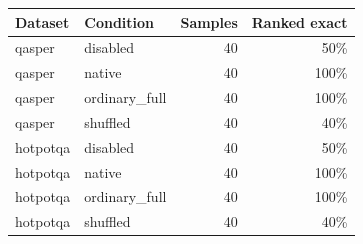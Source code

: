 \begin{tabular}{llrr}
\toprule
Dataset & Condition & Samples & Ranked exact \\
\midrule
qasper & disabled & 40 & 50\% \\
qasper & native & 40 & 100\% \\
qasper & ordinary\_full & 40 & 100\% \\
qasper & shuffled & 40 & 40\% \\
hotpotqa & disabled & 40 & 50\% \\
hotpotqa & native & 40 & 100\% \\
hotpotqa & ordinary\_full & 40 & 100\% \\
hotpotqa & shuffled & 40 & 40\% \\
\bottomrule
\end{tabular}

